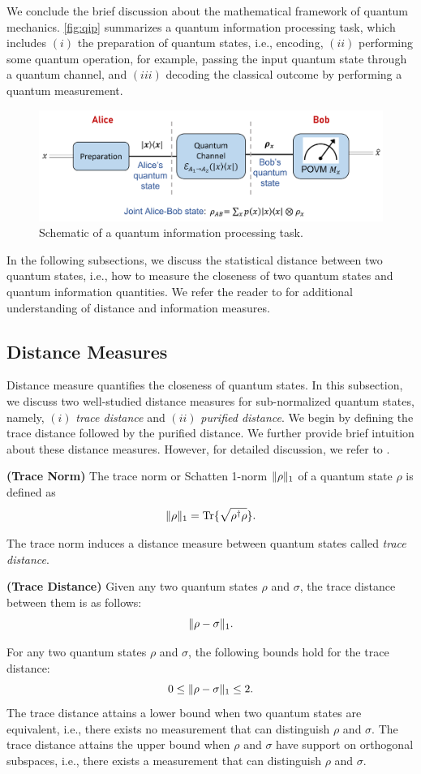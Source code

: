 We conclude the brief discussion about  the mathematical framework of quantum mechanics. \autoref{fig:qip} summarizes a quantum information processing task, which includes $(i)$ the preparation of quantum states, i.e., encoding, $(ii)$ performing some quantum operation, for example, passing the input quantum state through a quantum channel, and $(iii)$ decoding the classical outcome by performing a quantum measurement. 
\begin{figure}[!htb]
    \centering
    \includegraphics[scale=0.45]{Images/qip.png}
    \caption{Schematic of a quantum information processing task.}
    \label{fig:qip}
\end{figure}

In the following subsections, we discuss the statistical distance between two quantum states, i.e., how to measure the closeness of two quantum states and quantum information quantities. We refer the reader to \cite{wilde2013quantum, nielsen2002quantum} for additional understanding of distance and information measures. 
\subsection{Distance Measures} Distance measure quantifies the closeness of quantum states. In this subsection, we discuss two well-studied distance measures for sub-normalized quantum states, namely, $(i)$ \emph{trace distance} and $(ii)$ \emph{purified distance}. We begin by defining the trace distance followed by the purified distance. We further provide brief intuition about these distance measures. However, for detailed discussion, we refer to \cite{berta2013quantum}.
\begin{definition} \textbf{(Trace Norm)}
The trace norm or Schatten 1-norm $\lVert\rho\rVert_1$ of a quantum state $\rho$ is defined as 
\[\lVert\rho\rVert_1 = \operatorname{Tr}\{\sqrt{\rho^\dagger \rho}\}.\]
\end{definition}
The trace norm induces a distance measure between quantum states called \emph{trace distance}.
\begin{definition}\textbf{(Trace Distance)} Given any two quantum states $\rho$ and $\sigma$, the trace distance between them is as follows:
\[\lVert\rho-\sigma\rVert_1.\]
\end{definition}
For any two quantum states $\rho$ and $\sigma$, the following bounds hold for the trace distance:
\[0\leq \lVert\rho-\sigma\rVert_1 \leq 2.\]
The trace distance attains a lower bound when two quantum states are equivalent, i.e., there exists no measurement that can distinguish $\rho$ and $\sigma$. The trace distance attains the upper bound when $\rho$ and $\sigma$ have support on orthogonal subspaces, i.e., there exists a measurement that can distinguish $\rho$ and $\sigma$.

